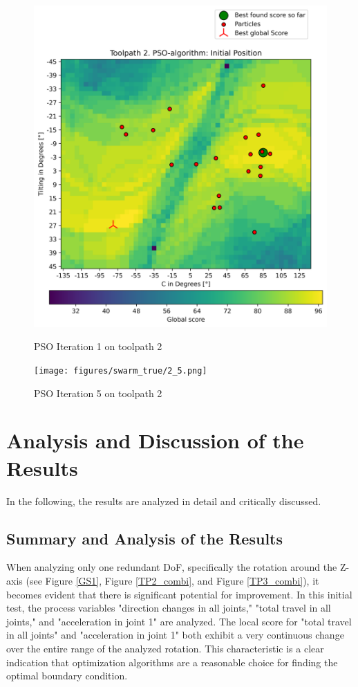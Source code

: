 \begin{figure}[H]	
	\centering
	\begin{minipage}{0.5\textwidth}
		\includegraphics[width=\textwidth]{figures/swarm_true/2_1.png}
		\caption{PSO Iteration 1 on toolpath 2}
		\label{tp2_0}
	\end{minipage}\hfill
	\begin{minipage}{0.5\textwidth}
		\texttt{[image: figures/swarm\_true/2\_5.png]}
		\caption{PSO Iteration 5 on toolpath 2}
		\label{tp2_5}
	\end{minipage}\par
\end{figure}




\section{Analysis and Discussion of the Results}%
In the following, the results are analyzed in detail and critically discussed.

\subsection{Summary and Analysis of the Results}
When analyzing only one redundant \acrshort{DoF}, specifically the rotation around the Z-axis (see Figure \ref{GS1}, Figure \ref{TP2_combi}, and Figure \ref{TP3_combi}), it becomes evident that there is significant potential for improvement. In this initial test, the process variables "direction changes in all joints," "total travel in all joints," and "acceleration in joint 1" are analyzed. The local score for "total travel in all joints" and "acceleration in joint 1" both exhibit a very continuous change over the entire range of the analyzed rotation. This characteristic is a clear indication that optimization algorithms are a reasonable choice for finding the optimal boundary condition.

